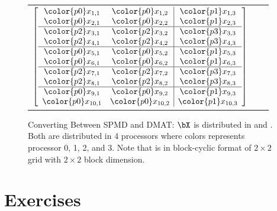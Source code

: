 \begin{figure}
\begin{center}
\begin{tabular}{ccc}
$
\left[
\begin{array}{cc|c}
\color{p0}x_{1,1} & \color{p0}x_{1,2} & \color{p1}x_{1,3} \\
\color{p0}x_{2,1} & \color{p0}x_{2,2} & \color{p1}x_{2,3} \\ \hline
\color{p2}x_{3,1} & \color{p2}x_{3,2} & \color{p3}x_{3,3} \\
\color{p2}x_{4,1} & \color{p2}x_{4,2} & \color{p3}x_{4,3} \\ \hline
\color{p0}x_{5,1} & \color{p0}x_{5,2} & \color{p1}x_{5,3} \\
\color{p0}x_{6,1} & \color{p0}x_{6,2} & \color{p1}x_{6,3} \\ \hline
\color{p2}x_{7,1} & \color{p2}x_{7,2} & \color{p3}x_{7,3} \\
\color{p2}x_{8,1} & \color{p2}x_{8,2} & \color{p3}x_{8,3} \\ \hline
\color{p0}x_{9,1} & \color{p0}x_{9,2} & \color{p1}x_{9,3} \\
\color{p0}x_{10,1} & \color{p0}x_{10,2} & \color{p1}x_{10,3} \\
\end{array}
\right]
$
\end{tabular}
\end{center}
\caption[Converting Between SPMD and DMAT]{
Converting Between SPMD and DMAT:  $\bX$ is distributed in
 and .
Both are distributed in 4 processors
where colors represents processor {\color{p0}0},
{\color{p1}1}, {\color{p2}2}, and {\color{p3}3}.
Note that  is in block-cyclic format of
$2\times 2$ grid with $2\times 2$ block dimension.
}
\label{fig:spmd_dmat}
\end{figure}



\section{Exercises}
\label{sec:redist_exercise}

